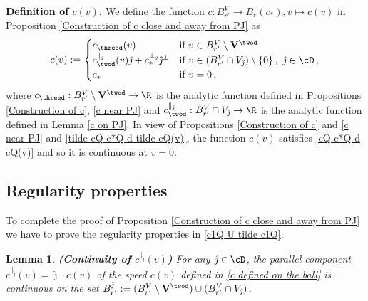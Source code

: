\documentclass[11pt,a4paper,reqno]{article}
\numberwithin{equation}{section}
\newtheorem{lemma}[theorem]{Lemma}
\theoremstyle{definition}
\begin{document}
   \noindent
   {\bf Definition of $c(v)$.}
   We define the function 
   $ c : B_{r'}^V\to B_{r} (c_*), 
   v \mapsto  c(v) $ in Proposition \ref{Construction of c close and away from PJ} as 
    \begin{equation}\label{c defined on the ball}
     \begin{aligned}     c(v):=\begin{cases}
                c_{\threed}(v) & \text{if} \ v\in B_{r'}^V\setminus {\bf V}^{\twod}\\
                 c^{\parallel_{\hat \jmath}}_{\twod} (v)\hat\jmath + c_*^{\bot_{\hat \jmath}} \hat\jmath^\bot& \text{if} \ v\in (B_{r'}^V\cap V_{\hat \jmath})\setminus \{0\}\, , \ {\hat \jmath} \in \cD \, , \\
                 c_*  & \text{if} \  v=0\, ,
            \end{cases}
            \end{aligned}
    \end{equation}
where $ c_{\threed} : B_{r'}^V\setminus {\bf V}^{\twod} \to \R  $ is the analytic function  
defined in Propositions \ref{Construction of c}, \ref{c near PJ} and  
$ c^{\parallel_{\hat \jmath}}_{\twod} : B_{r'}^V\cap V_{\hat \jmath} \to \R  $ is the analytic function 
defined in Lemma \ref{c on PJ}.  
 In view of Propositions \ref{Construction of c} and \ref{c near PJ} and 
\eqref{tilde cQ-c*Q d tilde cQ(v)},
the function $c(v)$  satisfies  \eqref{cQ-c*Q d cQ(v)} and so  it is continuous at $v=0$.






\subsection{Regularity properties}
To complete the proof of 
Proposition 
\ref{Construction of c close and away from PJ} we have to prove the 
regularity properties in 
\eqref{c1Q U tilde c1Q}. 

\begin{lemma}\label{lm:continuity of cparallel}
{\bf (Continuity  
of $ c^{\parallel_{\hat \jmath}} (v)$)}
    For any $ {\hat \jmath} \in \cD$, the parallel component $c^{\parallel_{\hat \jmath}}(v) = \hat\jmath \cdot c(v) $ of the speed $ c(v) $ defined in \eqref{c defined on the ball} is continuous on the set 
 $ B_{r'}^{\hat \jmath} := 
         (B_{r'}^V\setminus {\bf V}^{\twod})\cup (B_{r'}^V\cap V_{\hat \jmath}) $.
\end{lemma}
\end{document}
